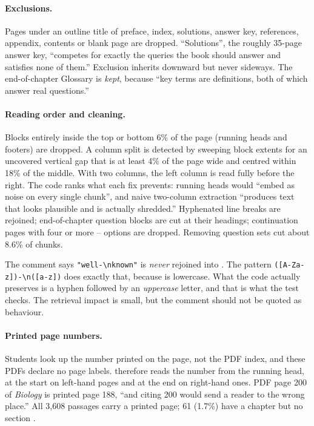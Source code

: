 \paragraph{Exclusions.} Pages under an outline title of preface, index, solutions, answer key, references, appendix, contents or blank page are dropped. ``Solutions'', the roughly 35-page answer key, ``competes for exactly the queries the book should answer and satisfies none of them.'' Exclusion inherits downward but never sideways. The end-of-chapter Glossary is \emph{kept}, because ``key terms are definitions, both of which answer real questions.''

\paragraph{Reading order and cleaning.} Blocks entirely inside the top or bottom 6\% of the page (running heads and footers) are dropped. A column split is detected by sweeping block extents for an uncovered vertical gap that is at least 4\% of the page wide and centred within 18\% of the middle. With two columns, the left column is read fully before the right. The code ranks what each fix prevents: running heads would ``embed as noise on every single chunk'', and naive two-column extraction ``produces text that looks plausible and is actually shredded.'' Hyphenated line breaks are rejoined; end-of-chapter question blocks are cut at their headings; continuation pages with four or more -- options are dropped. Removing question sets cut about 8.6\% of chunks.

\begin{finding}
The comment says \lstinline~"well-\nknown"~ is \emph{never} rejoined into . The pattern \lstinline~([A-Za-z])-\n([a-z])~ does exactly that, because  is lowercase. What the code actually preserves is a hyphen followed by an \emph{uppercase} letter, and that is what the test checks. The retrieval impact is small, but the comment should not be quoted as behaviour.
\end{finding}

\paragraph{Printed page numbers.} Students look up the number printed on the page, not the PDF index, and these PDFs declare no page labels.  therefore reads the number from the running head, at the start on left-hand pages and at the end on right-hand ones. PDF page 200 of \emph{Biology} is printed page 188, ``and citing 200 would send a reader to the wrong place.'' All 3,608 passages carry a printed page; 61 (1.7\%) have a chapter but no section \tagM.

